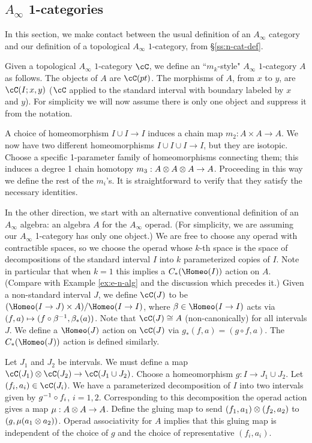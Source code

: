 \subsection{\texorpdfstring{$A_\infty$}{A-infinity} 1-categories}
\label{sec:comparing-A-infty}
In this section, we make contact between the usual definition of an $A_\infty$ category 
and our definition of a topological $A_\infty$ $1$-category, from \S \ref{ss:n-cat-def}.

\medskip

Given a topological $A_\infty$ $1$-category $\cC$, we define an ``$m_k$-style" 
$A_\infty$ $1$-category $A$ as follows.
The objects of $A$ are $\cC(pt)$.
The morphisms of $A$, from $x$ to $y$, are $\cC(I; x, y)$
($\cC$ applied to the standard interval with boundary labeled by $x$ and $y$).
For simplicity we will now assume there is only one object and suppress it from the notation.

A choice of homeomorphism $I\cup I \to I$ induces a chain map $m_2: A\times A\to A$.
We now have two different homeomorphisms $I\cup I\cup I \to I$, but they are isotopic.
Choose a specific 1-parameter family of homeomorphisms connecting them; this induces
a degree 1 chain homotopy $m_3:A\otimes A\otimes A\to A$.
Proceeding in this way we define the rest of the $m_i$'s.
It is straightforward to verify that they satisfy the necessary identities.

\medskip

In the other direction, we start with an alternative conventional definition of an $A_\infty$ algebra:
an algebra $A$ for the $A_\infty$ operad.
(For simplicity, we are assuming our $A_\infty$ 1-category has only one object.)
We are free to choose any operad with contractible spaces, so we choose the operad
whose $k$-th space is the space of decompositions of the standard interval $I$ into $k$
parameterized copies of $I$.
Note in particular that when $k=1$ this implies a $C_*(\Homeo(I))$ action on $A$.
(Compare with Example \ref{ex:e-n-alg} and the discussion which precedes it.)
Given a non-standard interval $J$, we define $\cC(J)$ to be
$(\Homeo(I\to J) \times A)/\Homeo(I\to I)$,
where $\beta \in \Homeo(I\to I)$ acts via $(f, a) \mapsto (f\circ \beta^{-1}, \beta_*(a))$.
Note that $\cC(J) \cong A$ (non-canonically) for all intervals $J$.
We define a $\Homeo(J)$ action on $\cC(J)$ via $g_*(f, a) = (g\circ f, a)$.
The $C_*(\Homeo(J))$ action is defined similarly.

Let $J_1$ and $J_2$ be intervals.
We must define a map $\cC(J_1)\ot\cC(J_2)\to\cC(J_1\cup J_2)$.
Choose a homeomorphism $g:I\to J_1\cup J_2$.
Let $(f_i, a_i)\in \cC(J_i)$.
We have a parameterized decomposition of $I$ into two intervals given by
$g^{-1} \circ f_i$, $i=1,2$.
Corresponding to this decomposition the operad action gives a map $\mu: A\otimes A\to A$.
Define the gluing map to send $(f_1, a_1)\otimes (f_2, a_2)$ to $(g, \mu(a_1\otimes a_2))$.
Operad associativity for $A$ implies that this gluing map is independent of the choice of
$g$ and the choice of representative $(f_i, a_i)$.

